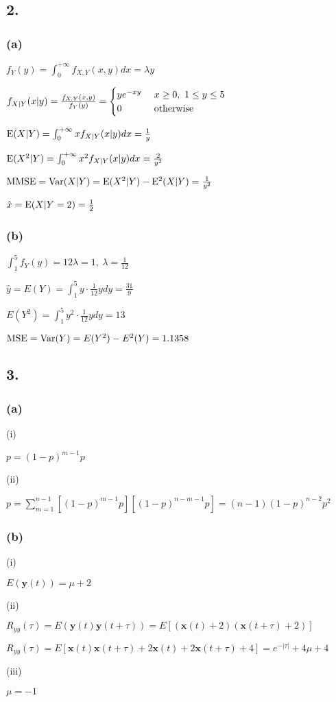 \documentclass{article}
\begin{document}
\subsection*{2.}
\subsubsection*{(a)}
$f_{Y}(y)=\int_{0}^{+ \infty}f_{X,Y}(x,y)dx=\lambda y$\par
$f_{X|Y}(x|y)=\frac{f_{X,Y}(x,y)}{f_{Y}(y)}=\begin{cases}
ye^{-xy} \ & x\geq 0, \ 1 \leq y \leq 5\\
0 \ & {\rm otherwise}
\end{cases}$\par
${\rm E}(X|Y)=\int_{0}^{+ \infty}xf_{X|Y}(x|y)dx=\frac{1}{y}$\par
${\rm E}(X^{2}|Y)=\int_{0}^{+ \infty}x^{2}f_{X|Y}(x|y)dx=\frac{2}{y^{2}}$\par
${\rm MMSE}={\rm Var}(X|Y)={\rm E}(X^{2}|Y)-{\rm E}^{2}(X|Y)=\frac{1}{y^{2}}$\par
$\hat{x}={\rm E}(X|Y=2)=\frac{1}{2}$\par
\subsubsection*{(b)}
$\int_{1}^{5}f_{Y}(y)=12\lambda=1, \ \lambda=\frac{1}{12}$\par
$\hat{y}=E(Y)=\int_{1}^{5}y\cdot\frac{1}{12}ydy=\frac{31}{9}$\par
$E(Y^2)=\int_{1}^{5}y^2\cdot\frac{1}{12}ydy=13$\par
${\rm MSE}={\rm Var}(Y)=E(Y^2)-E^2(Y)=1.1358$
\subsection*{3.}
\subsubsection*{(a)}
(i)\par
$p=(1-p)^{m-1}p$\par
(ii)\par
$p=\sum_{m=1}^{n-1} [(1-p)^{m-1}p] [(1-p)^{n-m-1}p]=(n-1)(1-p)^{n-2}p^2$
\subsubsection*{(b)}
(i)\par
$E(\mathbf{y}(t))=\mu +2$\par
(ii)\par
$R_{yy}(\tau)=E(\mathbf{y}(t)\mathbf{y}(t+\tau))=E[(\mathbf{x}(t)+2)(\mathbf{x}(t+\tau)+2)]$\par
$R_{yy}(\tau)=E[\mathbf{x}(t)\mathbf{x}(t+\tau)+2\mathbf{x}(t)+2\mathbf{x}(t+\tau)+4]=e^{-|\tau|}+4\mu+4$\par
(iii)\par
$\mu=-1$
\end{document}
